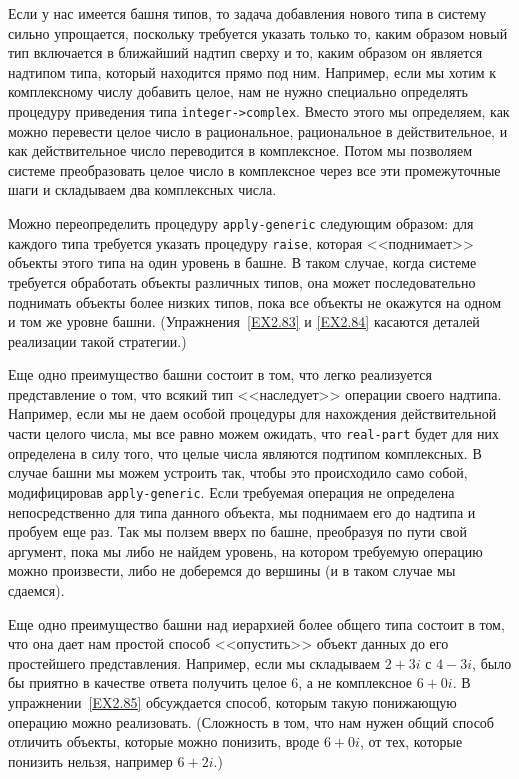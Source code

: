 Если у нас имеется башня типов, то задача добавления
нового типа в систему сильно упрощается, поскольку требуется указать
только то, каким образом новый тип включается в ближайший надтип
сверху и то, каким образом он является надтипом типа, который
находится прямо под ним.  Например, если мы хотим к комплексному числу
добавить целое, нам не нужно специально определять процедуру
приведения типа {\tt integer->complex}.  Вместо этого мы
определяем, как можно перевести целое число в рациональное,
рациональное в действительное, и как действительное число переводится
в комплексное.  Потом мы позволяем системе преобразовать целое число в
комплексное через все эти промежуточные шаги и складываем два
комплексных числа.

Можно переопределить процедуру {\tt apply-generic}
следующим образом:  для каждого типа
требуется указать процедуру {\tt raise}, которая <<поднимает>>
объекты этого типа на один уровень в башне.  В таком случае, когда
системе требуется обработать объекты различных типов, она может
последовательно поднимать объекты более низких типов, пока все объекты
не окажутся на одном и том же уровне башни.  
(Упражнения~\ref{EX2.83} и \ref{EX2.84}
касаются деталей реализации такой стратегии.)

Еще одно преимущество башни состоит в том, что легко
реализуется представление о том, что всякий тип <<наследует>> операции своего
надтипа.  Например, если мы не даем особой процедуры для нахождения
действительной части целого числа, мы все равно можем ожидать, что
{\tt real-part} будет для них определена в силу того, что целые
числа являются подтипом комплексных.  В случае башни мы можем устроить
так, чтобы это происходило само собой, модифицировав
{\tt apply-generic}.  Если требуемая операция не определена
непосредственно для типа данного объекта, мы поднимаем его до надтипа и
пробуем еще раз.  Так мы ползем вверх по башне, преобразуя по пути
свой аргумент, пока мы либо не найдем уровень, на котором требуемую
операцию можно произвести, либо не доберемся до вершины (и в таком
случае мы сдаемся).

Еще одно преимущество башни над иерархией более общего
типа состоит в том, что она дает нам простой способ  <<опустить>> объект
данных до его простейшего представления.  Например, если мы складываем
$2+3i$ с $4-3i$, было бы
приятно в качестве ответа получить целое 6, а не комплексное
$6+0i$.  В упражнении~\ref{EX2.85}
обсуждается способ, которым такую понижающую операцию можно
реализовать.  (Сложность в том, что нам нужен общий способ отличить
объекты, которые можно понизить, вроде $6+0i$,
от тех, которые понизить нельзя, например $6+2i$.)

